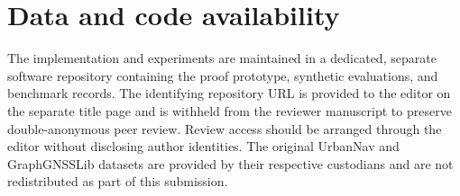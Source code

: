 \documentclass[referee,lineno,pdflatex,sn-basic,Numbered]{sn-jnl}
\begin{document}
\section*{Data and code availability}
The implementation and experiments are maintained in a dedicated, separate software repository containing the proof prototype, synthetic evaluations, and benchmark records. The identifying repository URL is provided to the editor on the separate title page and is withheld from the reviewer manuscript to preserve double-anonymous peer review. Review access should be arranged through the editor without disclosing author identities. The original UrbanNav and GraphGNSSLib datasets are provided by their respective custodians and are not redistributed as part of this submission.


\end{document}

